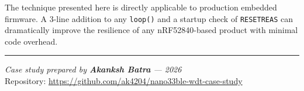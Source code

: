 \documentclass[12pt, a4paper]{article}
\begin{document}
The technique presented here is directly applicable to production embedded
firmware. A 3-line addition to any \texttt{loop()} and a startup check of
\texttt{RESETREAS} can dramatically improve the resilience of any nRF52840-based
product with minimal code overhead.

\vspace{1em}
\noindent\rule{\linewidth}{0.4pt}

\begin{center}
  \textit{Case study prepared by \textbf{Akanksh Batra} --- 2026}\\
  Repository: \url{https://github.com/ak4204/nano33ble-wdt-case-study}
\end{center}
\end{document}
